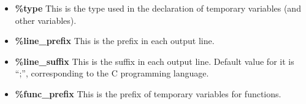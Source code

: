 \documentclass[a4paper]{article}
\begin{document}
\begin{itemize}
\item \textbf{\%type}
This is the type used in the declaration of temporary variables (and other variables).

\item \textbf{\%line\_prefix}
This is the prefix in each output line.

\item \textbf{\%line\_suffix}
This is the suffix in each output line. Default value for it is ``;'', corresponding to the C programming language.

\item \textbf{\%func\_prefix}
This is the prefix of temporary variables for functions.

\end{itemize}
\end{document}
